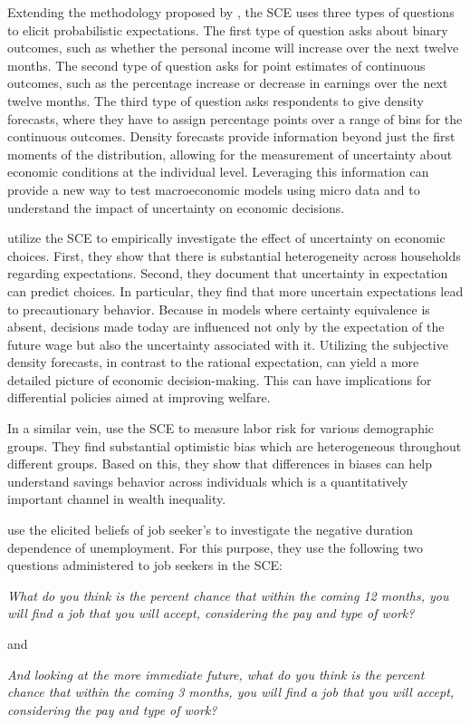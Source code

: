 \documentclass[11pt,a4paper,leqno]{article}
\begin{document}
Extending the methodology proposed by \textcite{Manski}, the SCE uses three types of questions to elicit probabilistic expectations. The first type of question asks about binary outcomes, such as whether the personal income will increase over the next twelve months. The second type of question asks for point estimates of continuous outcomes, such as the percentage increase or decrease in earnings over the next twelve months. The third type of question asks respondents to give density forecasts, where they have to assign percentage points over a range of bins for the continuous outcomes. Density forecasts provide information beyond just the first moments of the distribution, allowing for the measurement of uncertainty about economic conditions at the individual level. Leveraging this information can provide a new way to test macroeconomic models using micro data and to understand the impact of uncertainty on economic decisions. 

\textcite{BFKL2018} utilize the SCE to empirically investigate the effect of uncertainty on economic choices. First, they show that there is substantial heterogeneity across households regarding expectations. Second, they document that  uncertainty in expectation can predict choices. In particular, they find that more uncertain expectations lead to precautionary behavior. Because in models where certainty equivalence is absent, decisions made today are influenced not only by the expectation of the future wage but also the uncertainty associated with it. Utilizing the subjective density forecasts, in contrast to the rational expectation, can yield a more detailed picture of economic decision-making. This can have implications for differential policies aimed at improving welfare. 

In a similar vein, \textcite{Baleer2021} use the SCE to measure labor risk for various demographic groups. They find substantial optimistic bias which are heterogeneous throughout different groups. Based on this, they show that differences in biases can help understand savings behavior across individuals which is a quantitatively important channel in wealth inequality. 
%

\textcite{MST2021} use the elicited beliefs of job seeker's to investigate the negative duration dependence of unemployment. For this purpose, they use the following two questions administered to job seekers in the SCE:
\begin{center}
	\textit{What do you think is the percent chance that within the coming 12 months, you will find a job that you will accept, considering the pay and type of work?}
\end{center}
and
\begin{center}
	\textit{And looking at the more immediate future, what do you think is the percent chance that within the coming 3 months, you will find a job that you will accept, considering the pay and type of work?}
\end{center}
\end{document}
